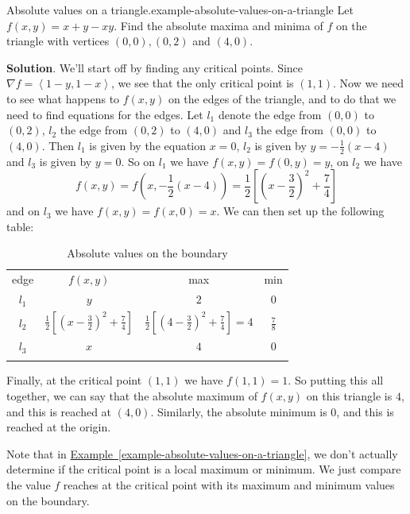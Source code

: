\documentclass[10pt,]{book}
\numberwithin{equation}{section}
\newcommand{\hrulethin}  {\noalign{\hrule height 0.04em}}
\newcommand{\hrulethick} {\noalign{\hrule height 0.11em}}
\newcommand{\grad}{\nabla}
\newcommand{\dotprod}[1]{\left\langle #1 \right\rangle}
\begin{document}
\begin{example}{Absolute values on a triangle.}{example-absolute-values-on-a-triangle}%
\hypertarget{p-1432}{}%
Let \(f(x,y) = x + y - xy\). Find the absolute maxima and minima of \(f\) on the triangle with vertices \((0,0), (0,2)\) and \((4,0)\).%
\par\smallskip%
\noindent\textbf{Solution}.\hypertarget{solution-233}{}\quad%
\hypertarget{p-1433}{}%
We'll start off by finding any critical points. Since \(\grad f = \dotprod{1-y, 1-x}\), we see that the only critical point is \((1,1)\). Now we need to see what happens to \(f(x,y)\) on the edges of the triangle, and to do that we need to find equations for the edges. Let \(l_{1}\) denote the edge from \((0,0)\) to \((0,2)\), \(l_{2}\) the edge from \((0,2)\) to \((4,0)\) and \(l_{3}\) the edge from \((0,0)\) to \((4,0)\). Then \(l_{1}\) is given by the equation \(x = 0\), \(l_{2}\) is given by \(y = -\frac{1}{2}(x-4)\) and \(l_{3}\) is given by \(y = 0\). So on \(l_{1}\) we have \(f(x,y) = f(0,y) = y\), on \(l_{2}\) we have%
\begin{equation*}
f(x,y) = f\left(x,-\frac{1}{2}(x-4)\right) = \frac{1}{2}\left[\left(x-\frac{3}{2}\right)^{2} + \frac{7}{4}\right]
\end{equation*}
and on \(l_{3}\) we have \(f(x,y) = f(x,0) = x\). We can then set up the following table:%
\begin{table}
\centering
\begin{tabular}{cccc}\hrulethick
edge&\(f(x,y)\)&max&min\tabularnewline\hrulethin
\(l_{1}\)&\(y\)&\(2\)&\(0\)\tabularnewline[0pt]
\(l_{2}\)&\(\frac{1}{2}\left[\left(x-\frac{3}{2}\right)^{2} + \frac{7}{4}\right]\)&\(\frac{1}{2}\left[\left(4-\frac{3}{2}\right)^{2} + \frac{7}{4}\right] = 4\)&\(\frac{7}{8}\)\tabularnewline[0pt]
\(l_{3}\)&\(x\)&\(4\)&\(0\)\tabularnewline\hrulethick
\end{tabular}
\caption{Absolute values on the boundary\label{table-triangle-extrema}}
\end{table}
\hypertarget{p-1434}{}%
Finally, at the critical point \((1,1)\) we have \(f(1,1) = 1\). So putting this all together, we can say that the absolute maximum of \(f(x,y)\) on this triangle is \(4\), and this is reached at \((4,0)\). Similarly, the absolute minimum is \(0\), and this is reached at the origin.%
\end{example}
\hypertarget{p-1435}{}%
Note that in \hyperref[example-absolute-values-on-a-triangle]{Example~\ref{example-absolute-values-on-a-triangle}}, we don't actually determine if the critical point is a local maximum or minimum. We just compare the value \(f\) reaches at the critical point with its maximum and minimum values on the boundary.%
\end{document}

